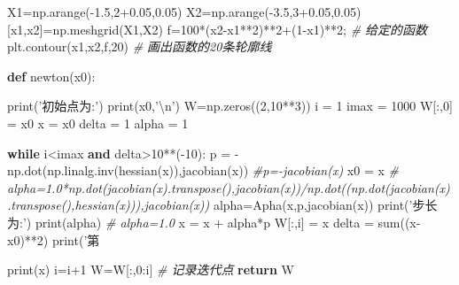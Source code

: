 \documentclass[]{article}
\newenvironment{Shaded}{}{}
\newcommand{\KeywordTok}[1]{\textcolor[rgb]{0.00,0.44,0.13}{\textbf{#1}}}
\newcommand{\DecValTok}[1]{\textcolor[rgb]{0.25,0.63,0.44}{#1}}
\newcommand{\FloatTok}[1]{\textcolor[rgb]{0.25,0.63,0.44}{#1}}
\newcommand{\CharTok}[1]{\textcolor[rgb]{0.25,0.44,0.63}{#1}}
\newcommand{\SpecialCharTok}[1]{\textcolor[rgb]{0.25,0.44,0.63}{#1}}
\newcommand{\StringTok}[1]{\textcolor[rgb]{0.25,0.44,0.63}{#1}}
\newcommand{\CommentTok}[1]{\textcolor[rgb]{0.38,0.63,0.69}{\textit{#1}}}
\newcommand{\ControlFlowTok}[1]{\textcolor[rgb]{0.00,0.44,0.13}{\textbf{#1}}}
\newcommand{\OperatorTok}[1]{\textcolor[rgb]{0.40,0.40,0.40}{#1}}
\newcommand{\BuiltInTok}[1]{#1}
\newcommand{\NormalTok}[1]{#1}
\begin{document}
\begin{Shaded}
\begin{Highlighting}[]
\NormalTok{X1}\OperatorTok{=}\NormalTok{np.arange(}\OperatorTok{-}\FloatTok{1.5}\NormalTok{,}\DecValTok{2}\OperatorTok{+}\FloatTok{0.05}\NormalTok{,}\FloatTok{0.05}\NormalTok{)}
\NormalTok{X2}\OperatorTok{=}\NormalTok{np.arange(}\OperatorTok{-}\FloatTok{3.5}\NormalTok{,}\DecValTok{3}\OperatorTok{+}\FloatTok{0.05}\NormalTok{,}\FloatTok{0.05}\NormalTok{)}
\NormalTok{[x1,x2]}\OperatorTok{=}\NormalTok{np.meshgrid(X1,X2)}
\NormalTok{f}\OperatorTok{=}\DecValTok{100}\OperatorTok{*}\NormalTok{(x2}\OperatorTok{-}\NormalTok{x1}\OperatorTok{**}\DecValTok{2}\NormalTok{)}\OperatorTok{**}\DecValTok{2}\OperatorTok{+}\NormalTok{(}\DecValTok{1}\OperatorTok{-}\NormalTok{x1)}\OperatorTok{**}\DecValTok{2}\OperatorTok{;} \CommentTok{# 给定的函数}
\NormalTok{plt.contour(x1,x2,f,}\DecValTok{20}\NormalTok{) }\CommentTok{# 画出函数的20条轮廓线}


\KeywordTok{def}\NormalTok{ newton(x0):}

    \BuiltInTok{print}\NormalTok{(}\StringTok{'初始点为:'}\NormalTok{)}
    \BuiltInTok{print}\NormalTok{(x0,}\StringTok{'}\CharTok{\textbackslash{}n}\StringTok{'}\NormalTok{)}
\NormalTok{    W}\OperatorTok{=}\NormalTok{np.zeros((}\DecValTok{2}\NormalTok{,}\DecValTok{10}\OperatorTok{**}\DecValTok{3}\NormalTok{))}
\NormalTok{    i }\OperatorTok{=} \DecValTok{1}
\NormalTok{    imax }\OperatorTok{=} \DecValTok{1000}
\NormalTok{    W[:,}\DecValTok{0}\NormalTok{] }\OperatorTok{=}\NormalTok{ x0}
\NormalTok{    x }\OperatorTok{=}\NormalTok{ x0}
\NormalTok{    delta }\OperatorTok{=} \DecValTok{1}
\NormalTok{    alpha }\OperatorTok{=} \DecValTok{1}

    \ControlFlowTok{while}\NormalTok{ i}\OperatorTok{<}\NormalTok{imax }\KeywordTok{and}\NormalTok{ delta}\OperatorTok{>}\DecValTok{10}\OperatorTok{**}\NormalTok{(}\OperatorTok{-}\DecValTok{10}\NormalTok{):}
\NormalTok{        p }\OperatorTok{=} \OperatorTok{-}\NormalTok{np.dot(np.linalg.inv(hessian(x)),jacobian(x))}
        \CommentTok{#p=-jacobian(x)}
\NormalTok{        x0 }\OperatorTok{=}\NormalTok{ x}
       \CommentTok{# alpha=1.0*np.dot(jacobian(x).transpose(),jacobian(x))/np.dot((np.dot(jacobian(x).transpose(),hessian(x))),jacobian(x))}
\NormalTok{        alpha}\OperatorTok{=}\NormalTok{Apha(x,p,jacobian(x))}
        \BuiltInTok{print}\NormalTok{(}\StringTok{'步长为:'}\NormalTok{)}
        \BuiltInTok{print}\NormalTok{(alpha)}
       \CommentTok{# alpha=1.0}
\NormalTok{        x }\OperatorTok{=}\NormalTok{ x }\OperatorTok{+}\NormalTok{ alpha}\OperatorTok{*}\NormalTok{p}
\NormalTok{        W[:,i] }\OperatorTok{=}\NormalTok{ x}
\NormalTok{        delta }\OperatorTok{=} \BuiltInTok{sum}\NormalTok{((x}\OperatorTok{-}\NormalTok{x0)}\OperatorTok{**}\DecValTok{2}\NormalTok{)}
        \BuiltInTok{print}\NormalTok{(}\StringTok{'第 }\SpecialCharTok{%d}\StringTok{ 次迭代结果:'}\OperatorTok{%}\NormalTok{(i))}
        \BuiltInTok{print}\NormalTok{(x)}
\NormalTok{        i}\OperatorTok{=}\NormalTok{i}\OperatorTok{+}\DecValTok{1}
\NormalTok{    W}\OperatorTok{=}\NormalTok{W[:,}\DecValTok{0}\NormalTok{:i]  }\CommentTok{# 记录迭代点}
    \ControlFlowTok{return}\NormalTok{ W}

}
\end{Highlighting}
\end{Shaded}
\end{document}
